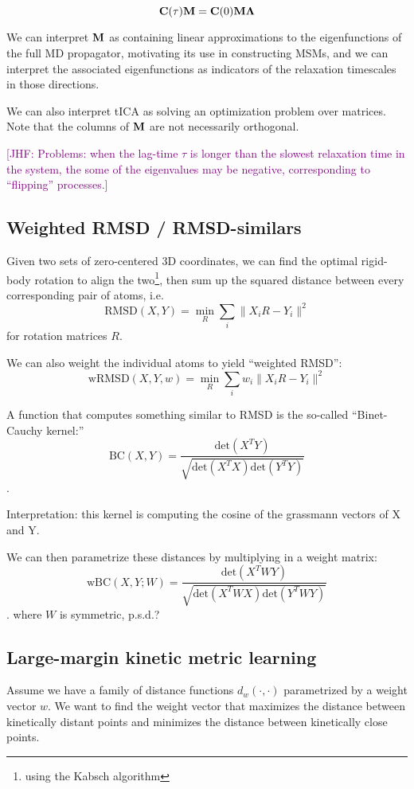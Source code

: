 \documentclass[aps,prl,preprint,nofootinbib,superscriptaddress,linenumbers]{revtex4-1}
\newcommand{\bfm}[1]{{\bf #1}}
\newcommand{\jhfcomment}[1]{\textcolor{purple}{[JHF: #1]}} 	%
\begin{document}
$$\bfm{C}(\tau) \bfm{M} = \bfm{C}(0) \bfm{M} \bfm{\Lambda}$$

We can interpret $\bfm{M}$ as containing linear approximations to the eigenfunctions of the full MD propagator, motivating its use in constructing MSMs, and we can interpret the associated eigenfunctions as indicators of the relaxation timescales in those directions.

We can also interpret tICA as solving an optimization problem over matrices. Note that the columns of $\bfm{M}$ are not necessarily orthogonal.


\jhfcomment{Problems: when the lag-time $\tau$ is longer than the slowest relaxation time in the system, the some of the eigenvalues may be negative, corresponding to ``flipping'' processes.}

\subsection{Weighted RMSD / RMSD-similars}
Given two sets of zero-centered 3D coordinates, we can find the optimal rigid-body rotation to align the two\footnote{using the Kabsch algorithm}, then sum up the squared distance between every corresponding pair of atoms, i.e.
$$ \text{RMSD}(X,Y) = \min_R \sum_i \| X_i R - Y_i \|^2 $$
for rotation matrices $R$.

We can also weight the individual atoms to yield ``weighted RMSD'':
$$ \text{wRMSD}(X,Y,w) = \min_R \sum_i w_i \| X_i R - Y_i \|^2 $$


A function that computes something similar to RMSD is the so-called ``Binet-Cauchy kernel:''
$$ \text{BC}(X,Y) = \frac{\text{det}(X^T Y)}{\sqrt{\text{det}(X^T X) \text{det}(Y^T Y)}} $$.

Interpretation: this kernel is computing the cosine of the grassmann vectors of X and Y.

We can then parametrize these distances by multiplying in a weight matrix:
$$ \text{wBC}(X,Y; W) = \frac{\text{det}(X^T W Y)}{\sqrt{\text{det}(X^T W X) \text{det}(Y^T W Y)}} $$.
where $W$ is symmetric, p.s.d.?

\subsection{Large-margin kinetic metric learning}
Assume we have a family of distance functions $d_w(\cdot, \cdot)$ parametrized by a weight vector $w$. We want to find the weight vector that maximizes the distance between kinetically distant points and minimizes the distance between kinetically close points.
\end{document}
